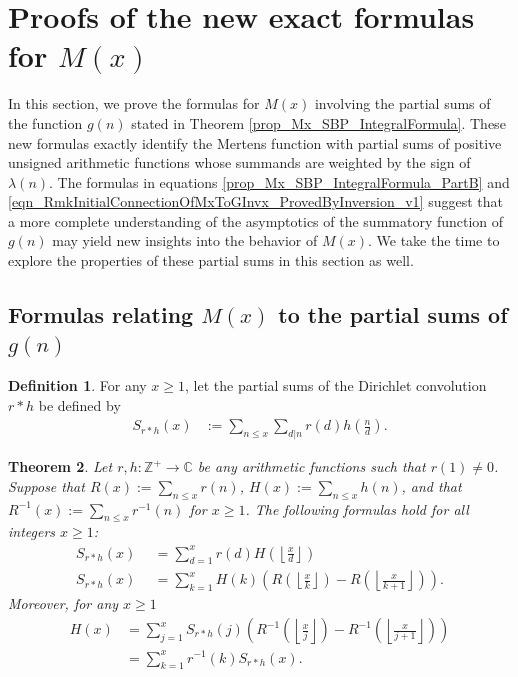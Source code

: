 \documentclass[11pt,reqno,a4letter]{article}
\newcommand{\hlocalref}[1]{\hyperref[#1]{\ref{#1}}}
\numberwithin{equation}{section}
\numberwithin{figure}{section}
\numberwithin{table}{section}
\newcommand{\Floor}[2]{\ensuremath{\left\lfloor \frac{#1}{#2} \right\rfloor}}
\theoremstyle{plain}
\newtheorem{theorem}{Theorem}
\numberwithin{theorem}{section}
\theoremstyle{definition}
\newtheorem{definition}[theorem]{Definition}
\begin{document}
\section{Proofs of the new exact formulas for $M(x)$} 
\label{Section_KeyApplications} 
\label{Section_KeyApplications_NewExactFormulasForMx_FullSectionLabel} 

In this section, we prove the formulas for $M(x)$ involving the partial sums 
of the function $g(n)$ stated in 
Theorem \hlocalref{prop_Mx_SBP_IntegralFormula}. 
These new formulas exactly identify the Mertens function with partial sums of 
positive unsigned arithmetic functions whose summands are 
weighted by the sign of $\lambda(n)$. 
The formulas in equations 
\eqref{prop_Mx_SBP_IntegralFormula_PartB} and 
\eqref{eqn_RmkInitialConnectionOfMxToGInvx_ProvedByInversion_v1} 
suggest that a more complete understanding of the 
asymptotics of the summatory function of $g(n)$ 
may yield new insights into the behavior of $M(x)$. 
We take the time to explore the properties of these partial sums in 
this section as well. 

\subsection{Formulas relating $M(x)$ to the partial sums of $g(n)$} 
\label{subSection_KeyApplications_NewExactFormulasForMx} 

\begin{definition}
For any $x \geq 1$, let the partial sums of the Dirichlet convolution $r \ast h$ be defined by 
\begin{align*} 
S_{r \ast h}(x) & := \sum_{n \leq x} \sum_{d|n} r(d) h\left(\frac{n}{d}\right). 
\end{align*}
\end{definition}

\begin{theorem} 
\label{theorem_SummatoryFuncsOfDirCvls} 
Let $r,h: \mathbb{Z}^{+} \rightarrow \mathbb{C}$ be any 
arithmetic functions such that $r(1) \neq 0$. 
Suppose that $R(x) := \sum_{n \leq x} r(n)$, $H(x) := \sum_{n \leq x} h(n)$, and that 
$R^{-1}(x) := \sum_{n \leq x} r^{-1}(n)$ for $x \geq 1$. 
The following formulas hold for all integers $x \geq 1$: 
\begin{align*} 
S_{r \ast h}(x) & \phantom{:}= \sum_{d=1}^x r(d) H\left(\Floor{x}{d}\right) \\ 
S_{r \ast h}(x) & \phantom{:}= \sum_{k=1}^{x} H(k) \left(R\left(\Floor{x}{k}\right) - 
     R\left(\Floor{x}{k+1}\right)\right). 
\end{align*} 
Moreover, for any $x \geq 1$ 
\begin{align*} 
H(x) & = \sum_{j=1}^{x} S_{r \ast h}(j) \left(R^{-1}\left(\Floor{x}{j}\right) - 
     R^{-1}\left(\Floor{x}{j+1}\right)\right) \\ 
     & = \sum_{k=1}^{x} r^{-1}(k) S_{r \ast h}(x). 
\end{align*} 
\end{theorem} 
\end{document}
